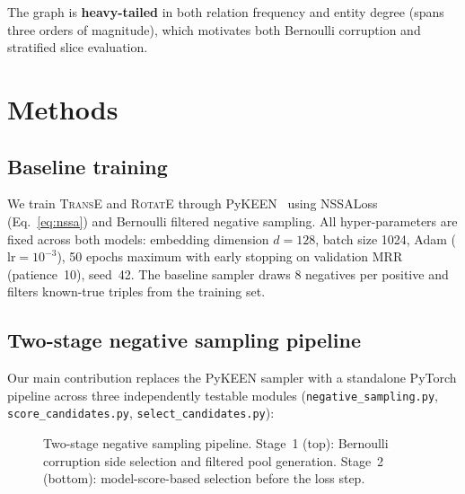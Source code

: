 \documentclass[10pt,twocolumn,letterpaper]{article}
\begin{document}
The graph is \textbf{heavy-tailed} in both relation frequency and entity
degree (spans three orders of magnitude), which motivates both Bernoulli
corruption and stratified slice evaluation.

\section{Methods}
\label{sec:methods}

\subsection{Baseline training}

We train \textsc{TransE} and \textsc{RotatE} through PyKEEN~\cite{ali2021pykeen}
using NSSALoss (Eq.~\ref{eq:nssa}) and Bernoulli filtered negative sampling.
All hyper-parameters are fixed across both models:
embedding dimension $d=128$, batch size 1024, Adam ($\mathrm{lr}=10^{-3}$),
50 epochs maximum with early stopping on validation MRR (patience~10),
seed~42.
The baseline sampler draws 8 negatives per positive and filters known-true
triples from the training set.

\subsection{Two-stage negative sampling pipeline}

Our main contribution replaces the PyKEEN sampler with a standalone PyTorch
pipeline across three independently testable modules
(\texttt{negative\_sampling.py}, \texttt{score\_candidates.py},
\texttt{select\_candidates.py}):

\begin{figure}[h]
\centering
{}
\caption{Two-stage negative sampling pipeline. Stage~1 (top): Bernoulli
corruption side selection and filtered pool generation. Stage~2 (bottom):
model-score-based selection before the loss step.}
\label{fig:pipeline}
\end{figure}
\end{document}

